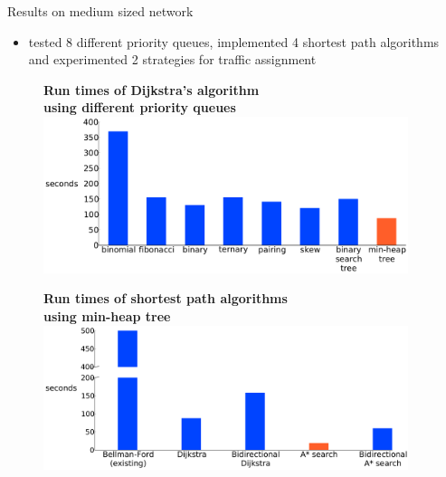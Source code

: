 \documentclass[final]{beamer}
\begin{document}
\begin{frame}{ }
\begin{columns}[t]
\begin{column}{.4\linewidth}
        \end{column}
        \begin{column}{.26\linewidth}
            \begin{block}{Results on medium sized network}
                \begin{itemize}
                    \itemsep.5em
                    \item tested \alert{8 different priority queues}, implemented \alert{4 shortest path algorithms} and experimented \alert{2 strategies} for traffic assignment
                \end{itemize}
                \begin{figure}
                    \centering
                    {\bfseries \qquad Run times of Dijkstra's algorithm\\ \qquad using different priority queues}
                    \includegraphics[width=\linewidth]{img/pq_runtime}
                \end{figure}
                \begin{figure}
                    \centering
                    {\bfseries \qquad Run times of shortest path algorithms\\ using min-heap tree}
                    \includegraphics[width=\linewidth]{img/runtime}
                \end{figure}
                \begin{figure}
                    \centering

\end{figure}
\end{block}
\end{column}
\end{columns}
\end{frame}
\end{document}
